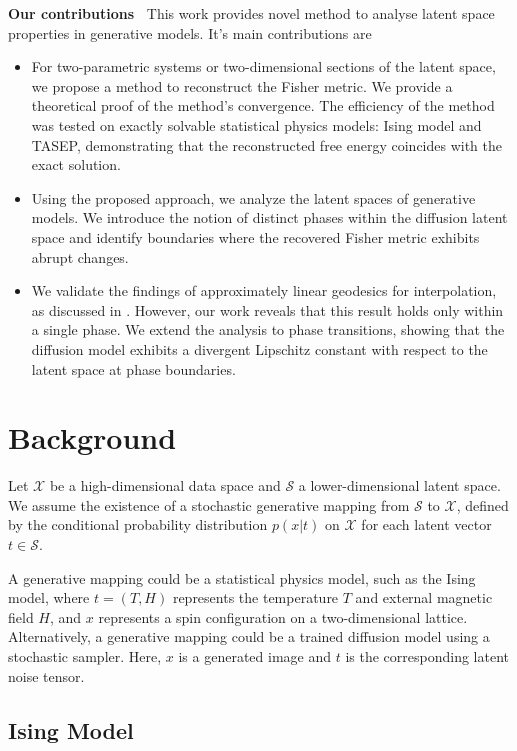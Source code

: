 \documentclass{article}
\theoremstyle{plain}
\theoremstyle{definition}
\theoremstyle{remark}
\begin{document}
\textbf{Our contributions~} This work provides novel method to analyse latent space properties in generative models. It's main contributions are
\begin{itemize}
    \item For two-parametric systems or two-dimensional sections of the latent space, we propose a method to reconstruct the Fisher metric. We provide a theoretical proof of the method's convergence. The efficiency of the method was tested on exactly solvable statistical physics models: Ising model and TASEP, demonstrating that the reconstructed free energy coincides with the exact solution.
    \item Using the proposed approach, we analyze the latent spaces of generative models. We introduce the notion of distinct phases within the diffusion latent space and identify boundaries where the recovered Fisher metric exhibits abrupt changes.
    \item We validate the findings of approximately linear geodesics for interpolation, as discussed in \cite{shao2018riemannian}. However, our work reveals that this result holds only within a single phase. We extend the analysis to phase transitions, showing that the diffusion model exhibits a divergent Lipschitz constant with respect to the latent space at phase boundaries.

\end{itemize}

\section{Background}

Let $\mathcal{X}$ be a high-dimensional data space and $\mathcal{S}$ a lower-dimensional latent space.  We assume the existence of a stochastic generative mapping from $\mathcal{S}$ to $\mathcal{X}$, defined by the conditional probability distribution $p(x|t)$ on $\mathcal{X}$ for each latent vector $t \in \mathcal{S}$.

A generative mapping could be a statistical physics model, such as the Ising model, where $t = (T, H)$ represents the temperature $T$ and external magnetic field $H$, and $x$ represents a spin configuration on a two-dimensional lattice. Alternatively, a generative mapping could be a trained diffusion model using a stochastic sampler. Here, $x$ is a generated image and $t$ is the corresponding latent noise tensor.


\subsection{Ising Model}
\end{document}
